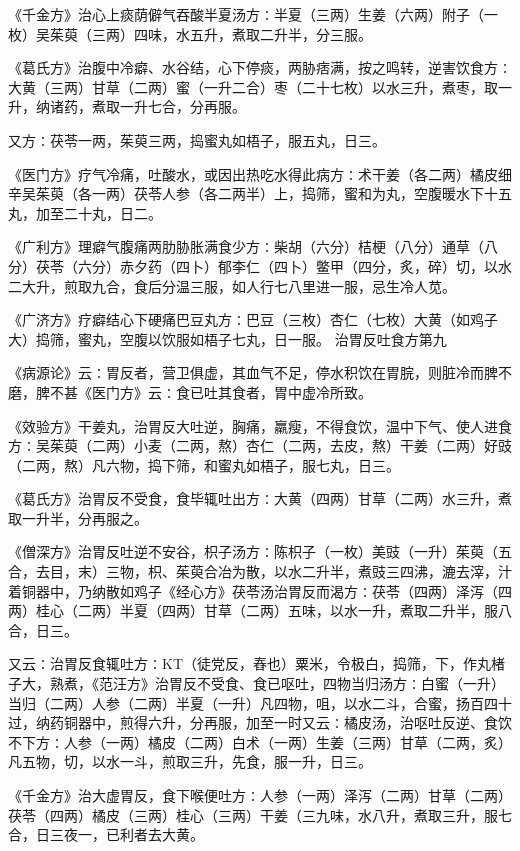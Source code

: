 \documentclass[a4paper,12pt,UTF8,twoside]{ctexbook}
\begin{document}
《千金方》治心上痰荫僻气吞酸半夏汤方∶半夏（三两）生姜（六两）附子（一枚）吴茱萸（三两）四味，水五升，煮取二升半，分三服。

《葛氏方》治腹中冷癖、水谷结，心下停痰，两胁痞满，按之鸣转，逆害饮食方∶大黄（三两）甘草（二两）蜜（一升二合）枣（二十七枚）以水三升，煮枣，取一升，纳诸药，煮取一升七合，分再服。

又方∶茯苓一两，茱萸三两，捣蜜丸如梧子，服五丸，日三。

《医门方》疗气冷痛，吐酸水，或因出热吃水得此病方∶术干姜（各二两）橘皮细辛吴茱萸（各一两）茯苓人参（各二两半）上，捣筛，蜜和为丸，空腹暖水下十五丸，加至二十丸，日二。

《广利方》理癖气腹痛两肋胁胀满食少方∶柴胡（六分）桔梗（八分）通草（八分）茯苓（六分）赤夕药（四卜）郁李仁（四卜）鳖甲（四分，炙，碎）切，以水二大升，煎取九合，食后分温三服，如人行七八里进一服，忌生冷人苋。

《广济方》疗癖结心下硬痛巴豆丸方∶巴豆（三枚）杏仁（七枚）大黄（如鸡子大）捣筛，蜜丸，空腹以饮服如梧子七丸，日一服。
治胃反吐食方第九

《病源论》云∶胃反者，营卫俱虚，其血气不足，停水积饮在胃脘，则脏冷而脾不磨，脾不甚《医门方》云∶食已吐其食者，胃中虚冷所致。

《效验方》干姜丸，治胃反大吐逆，胸痛，羸瘦，不得食饮，温中下气、使人进食方∶吴茱萸（二两）小麦（二两，熬）杏仁（二两，去皮，熬）干姜（二两）好豉（二两，熬）凡六物，捣下筛，和蜜丸如梧子，服七丸，日三。

《葛氏方》治胃反不受食，食毕辄吐出方∶大黄（四两）甘草（二两）水三升，煮取一升半，分再服之。

《僧深方》治胃反吐逆不安谷，枳子汤方∶陈枳子（一枚）美豉（一升）茱萸（五合，去目，末）三物，枳、茱萸合冶为散，以水二升半，煮豉三四沸，漉去滓，汁着铜器中，乃纳散如鸡子《经心方》茯苓汤治胃反而渴方∶茯苓（四两）泽泻（四两）桂心（二两）半夏（四两）甘草（二两）五味，以水一升，煮取二升半，服八合，日三。

又云∶治胃反食辄吐方∶KT（徒党反，舂也）粟米，令极白，捣筛，下，作丸楮子大，熟煮，《范汪方》治胃反不受食、食已呕吐，四物当归汤方∶白蜜（一升）当归（二两）人参（二两）半夏（一升）凡四物，咀，以水二斗，合蜜，扬百四十过，纳药铜器中，煎得六升，分再服，加至一时又云∶橘皮汤，治呕吐反逆、食饮不下方∶人参（一两）橘皮（二两）白术（一两）生姜（三两）甘草（二两，炙）凡五物，切，以水一斗，煎取三升，先食，服一升，日三。

《千金方》治大虚胃反，食下喉便吐方∶人参（一两）泽泻（二两）甘草（二两）茯苓（四两）橘皮（三两）桂心（三两）干姜（三九味，水八升，煮取三升，服七合，日三夜一，已利者去大黄。
\end{document}
